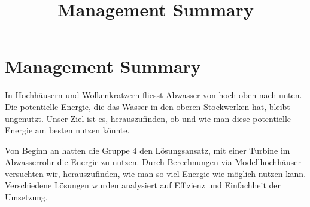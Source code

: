 \documentclass[12pt]{article}
\title{Management Summary}
\begin{document}
\section*{Management Summary}
In Hochhäusern und Wolkenkratzern fliesst Abwasser von hoch oben nach unten. Die potentielle Energie, die das Wasser in den oberen Stockwerken hat, bleibt ungenutzt. Unser Ziel ist es, herauszufinden, ob und wie man diese potentielle Energie am besten nutzen könnte. 

Von Beginn an hatten die Gruppe 4 den Lösungsansatz, mit einer Turbine im Abwasserrohr die Energie zu nutzen. Durch Berechnungen via Modellhochhäuser versuchten wir, herauszufinden, wie man so viel Energie wie möglich nutzen kann. Verschiedene Lösungen wurden analysiert auf Effizienz und Einfachheit der Umsetzung.



\end{document}
